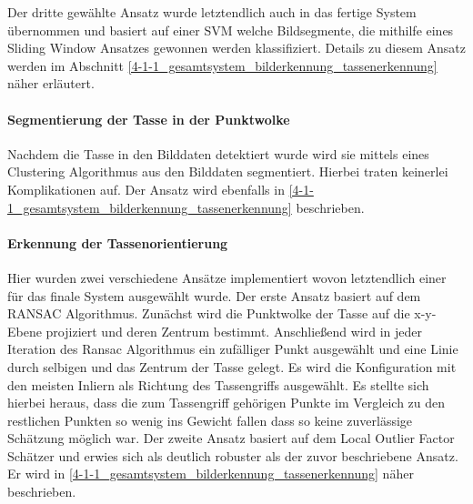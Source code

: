 Der dritte gewählte Ansatz wurde letztendlich auch in das fertige System übernommen und basiert auf einer SVM welche Bildsegmente, die mithilfe eines Sliding Window Ansatzes gewonnen werden klassifiziert. Details zu diesem Ansatz werden im Abschnitt \ref{4-1-1_gesamtsystem_bilderkennung_tassenerkennung} näher erläutert.

\paragraph{Segmentierung der Tasse in der Punktwolke}
Nachdem die Tasse in den Bilddaten detektiert wurde wird sie mittels eines Clustering Algorithmus aus den Bilddaten segmentiert. Hierbei traten keinerlei Komplikationen auf. Der Ansatz wird ebenfalls in \ref{4-1-1_gesamtsystem_bilderkennung_tassenerkennung} beschrieben.

\paragraph{Erkennung der Tassenorientierung}
Hier wurden zwei verschiedene Ansätze implementiert wovon letztendlich einer für das finale System ausgewählt wurde. Der erste Ansatz basiert auf dem RANSAC Algorithmus. Zunächst wird die Punktwolke der Tasse auf die x-y-Ebene projiziert und deren Zentrum bestimmt. Anschließend wird in jeder Iteration des Ransac Algorithmus ein zufälliger Punkt ausgewählt und eine Linie durch selbigen und das Zentrum der Tasse gelegt. Es wird die Konfiguration mit den meisten Inliern als Richtung des Tassengriffs ausgewählt. Es stellte sich hierbei heraus, dass die zum Tassengriff gehörigen Punkte im Vergleich zu den restlichen Punkten so wenig ins Gewicht fallen dass so keine zuverlässige Schätzung möglich war.
Der zweite Ansatz basiert auf dem Local Outlier Factor Schätzer und erwies sich als deutlich robuster als der zuvor beschriebene Ansatz. Er wird in \ref{4-1-1_gesamtsystem_bilderkennung_tassenerkennung} näher beschrieben.